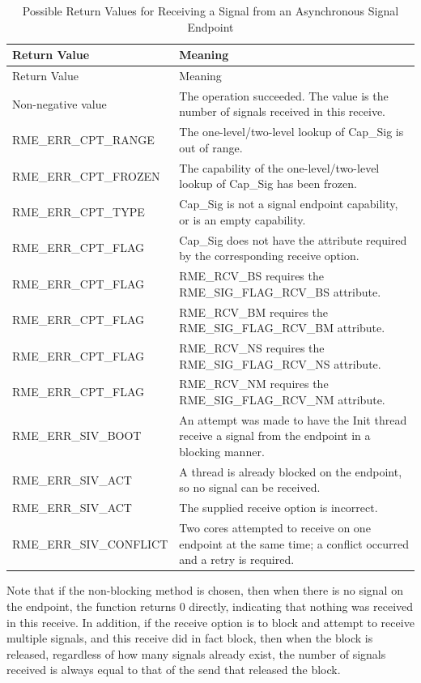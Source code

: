 \begin{xltabular}{\textwidth}{@{}>{\hsize\raggedright\arraybackslash}X>{\hsize\raggedright\arraybackslash}X@{}}
\caption{Possible Return Values for Receiving a Signal from an Asynchronous Signal Endpoint}\label{tab:5-23-receive-signal-return-values}\\
\toprule
Return Value & Meaning\tabularnewline
\endfirsthead
\toprule
Return Value & Meaning\tabularnewline
\midrule
\endhead
\bottomrule
\endlastfoot
    Non-negative value & The operation succeeded. The value is the number of signals received in this receive.\tabularnewline
    RME\_ERR\_CPT\_RANGE & The one-level/two-level lookup of Cap\_Sig is out of range.\tabularnewline
    RME\_ERR\_CPT\_FROZEN & The capability of the one-level/two-level lookup of Cap\_Sig has been frozen.\tabularnewline
    RME\_ERR\_CPT\_TYPE & Cap\_Sig is not a signal endpoint capability, or is an empty capability.\tabularnewline
    RME\_ERR\_CPT\_FLAG & Cap\_Sig does not have the attribute required by the corresponding receive option.\tabularnewline
    RME\_ERR\_CPT\_FLAG & RME\_RCV\_BS requires the RME\_SIG\_FLAG\_RCV\_BS attribute.\tabularnewline
    RME\_ERR\_CPT\_FLAG & RME\_RCV\_BM requires the RME\_SIG\_FLAG\_RCV\_BM attribute.\tabularnewline
    RME\_ERR\_CPT\_FLAG & RME\_RCV\_NS requires the RME\_SIG\_FLAG\_RCV\_NS attribute.\tabularnewline
    RME\_ERR\_CPT\_FLAG & RME\_RCV\_NM requires the RME\_SIG\_FLAG\_RCV\_NM attribute.\tabularnewline
    RME\_ERR\_SIV\_BOOT & An attempt was made to have the Init thread receive a signal from the endpoint in a blocking manner.\tabularnewline
    RME\_ERR\_SIV\_ACT & A thread is already blocked on the endpoint, so no signal can be received.\tabularnewline
    RME\_ERR\_SIV\_ACT & The supplied receive option is incorrect.\tabularnewline
    RME\_ERR\_SIV\_CONFLICT & Two cores attempted to receive on one endpoint at the same time; a conflict occurred and a retry is required.\tabularnewline
\end{xltabular}
\nopagebreak[4]

Note that if the non-blocking method is chosen, then when there is no signal on the endpoint, the function returns 0 directly, indicating that nothing was received in this receive. In addition, if the receive option is to block and attempt to receive multiple signals, and this receive did in fact block, then when the block is released, regardless of how many signals already exist, the number of signals received is always equal to that of the send that released the block.

